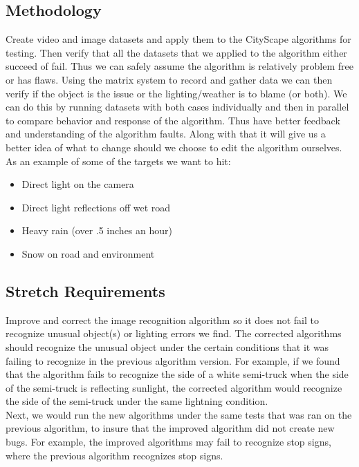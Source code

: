 \documentclass[10pt,draftclsnofoot,onecolumn,journal,compsoc]{IEEEtran}
\begin{document}
	\subsection{Methodology}
    Create video and image datasets and apply them to the CityScape algorithms for testing. 
    Then verify that all the datasets that we applied to the algorithm either succeed of fail.
    Thus we can safely assume the algorithm is relatively problem free or has flaws.
    Using the matrix system to record and gather data we can then verify if the object is the issue or the lighting/weather is to blame (or both).
    We can do this by running datasets with both cases individually and then in parallel to compare behavior and response of the algorithm.
    Thus have better feedback and understanding of the algorithm faults.
    Along with that it will give us a better idea of what to change should we choose to edit the algorithm ourselves.
    \newline
    As an example of some of the targets we want to hit:
	\begin{itemize}
 		 \item Direct light on the camera
 		 \item Direct light reflections off wet road
         \item Heavy rain (over .5 inches an hour)
         \item Snow on road and environment
	\end{itemize}
    
    \subsection{Stretch Requirements}

    Improve and correct the image recognition algorithm so it does not fail to recognize unusual object(s) or lighting errors we find. 
    The corrected algorithms should recognize the unusual object under the certain conditions that it was failing to recognize in the previous algorithm version.
    For example, if we found that the algorithm fails to recognize the side of a white semi-truck when the side of the semi-truck is reflecting sunlight, the corrected algorithm would recognize the side of the semi-truck under the same lightning condition.\\
    Next, we would run the new algorithms under the same tests that was ran on the previous algorithm, to insure that the improved algorithm did not create new bugs. 
    For example, the improved algorithms may fail to recognize stop signs, where the previous algorithm recognizes stop signs.
 
\end{document}
